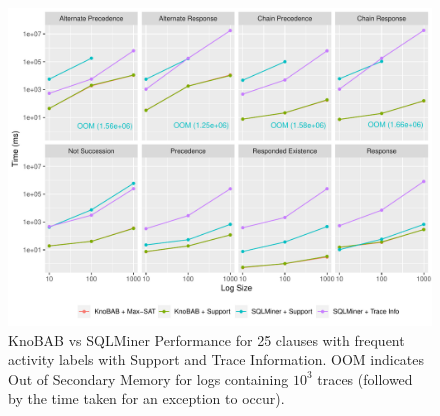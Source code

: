\begin{figure}[!t]
	\hspace*{-3mm}
	\includegraphics[width=1.05\linewidth]{images/sqlminer_benchmark.pdf}
	\caption{KnoBAB vs SQLMiner Performance for 25 clauses with frequent activity labels with Support and Trace Information. OOM indicates Out of Secondary Memory for logs containing $10^3$ traces (followed by the time taken for an exception to occur).}\label{fig:vsSQL}
	\vspace{-5mm}
\end{figure}
